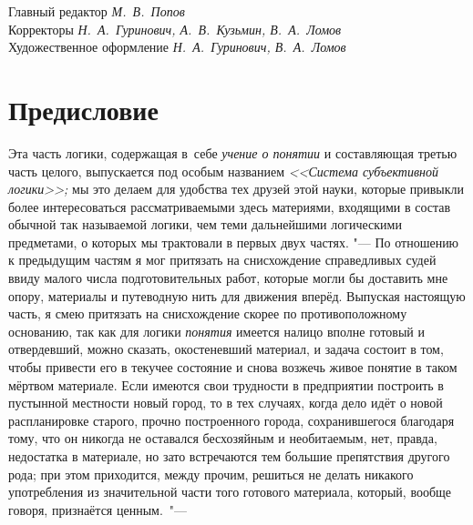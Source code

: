 Главный редактор {\em М.~В.~Попов} \\
Корректоры {\em Н.~А.~Гуринович, А.~В.~Кузьмин, В.~А.~Ломов} \\
Художественное оформление {\em Н.~А.~Гуринович, В.~А.~Ломов}

\bigskip
\clearpage

\chapter[Предисловие]{Предисловие}

Эта часть логики, содержащая в~себе {\em учение о понятии} и составляющая
третью часть целого, выпускается под особым названием {\em <<Система
субъективной логики>>;} мы это делаем для удобства тех друзей этой науки,
которые привыкли более интересоваться рассматриваемыми здесь материями,
входящими в состав обычной так называемой логики, чем теми дальнейшими
логическими предметами, о которых мы трактовали в первых двух частях. "---
По отношению к предыдущим частям я мог притязать на снисхождение
справедливых судей ввиду малого числа подготовительных работ, которые могли
бы доставить мне опору, материалы и путеводную нить для
движения вперёд. Выпуская настоящую часть, я смею притязать на снисхождение
скорее по противоположному основанию, так как для логики {\em понятия} имеется
налицо вполне готовый и отвердевший, можно сказать, окостеневший материал,
и задача состоит в том, чтобы привести его в текучее состояние и снова
возжечь живое понятие в таком мёртвом материале. Если имеются свои
трудности в предприятии построить в пустынной местности новый город, то в
тех случаях, когда дело идёт о новой распланировке старого, прочно
построенного города, сохранившегося благодаря тому, что он никогда не
оставался бесхозяйным и необитаемым, нет, правда, недостатка в материале,
но зато встречаются тем большие препятствия другого рода; при этом
приходится, между прочим, решиться не делать никакого употребления из
значительной части того готового материала, который, вообще говоря,
признаётся ценным.~"---

